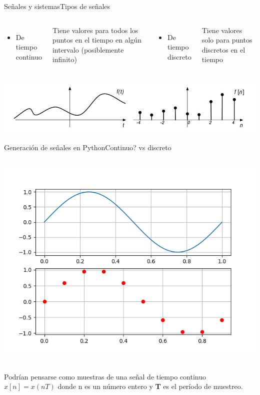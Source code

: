  \begin{frame}{Señales y sistemas}{Tipos de señales}
    \begin{columns}[onlytextwidth]
       \begin{itemize}
          \item{De tiempo continuo}
       \end{itemize}
       Tiene valores para todos los puntos en el tiempo en algún intervalo (posiblemente infinito)
       \begin{itemize}
          \item{De tiempo discreto}
       \end{itemize}
       Tiene valores solo para puntos discretos en el tiempo
    \end{columns}
    \vfill
    \includegraphics[width=\textwidth]{1_clase/continuo_vs_discreto}
 \end{frame}
 \begin{frame}{Generación de señales en Python}{Continuo? vs discreto}
    \begin{columns}[onlytextwidth]
       
       \includegraphics[width=\textwidth]{1_clase/python_continuo_vs_discreto}
    \end{columns}
    Podrían pensarse como muestras de una señal de tiempo continuo $x[n] = x (nT)$ donde n es un número entero y \textbf{T} es el período de muestreo.
    \vfill
 \end{frame}
